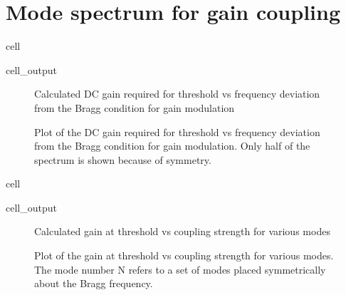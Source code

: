 \documentclass[a4paper,10pt,english,openany,oneside]{jupyterBook}
\begin{document}
\section{Mode spectrum for gain coupling}
\label{\detokenize{Kogelnik-Shank_Coupled-Wave-Theory_DFB-Lasers:mode-spectrum-for-gain-coupling}}
\begin{sphinxuseclass}{cell}\begin{sphinxVerbatimOutput}

\begin{sphinxuseclass}{cell_output}
\begin{figure}[htbp]
\centering
\capstart

\noindent{}
\caption{Calculated DC gain required for threshold vs frequency deviation from the Bragg condition for gain modulation}\label{\detokenize{Kogelnik-Shank_Coupled-Wave-Theory_DFB-Lasers:kogelnik7c}}\end{figure}

\end{sphinxuseclass}\end{sphinxVerbatimOutput}

\end{sphinxuseclass}
\begin{figure}[htbp]
\centering
\capstart

\noindent{}
\caption{Plot of the DC gain required for threshold vs frequency deviation from the Bragg condition for gain modulation. Only half of the spectrum is shown because of symmetry.}\label{\detokenize{Kogelnik-Shank_Coupled-Wave-Theory_DFB-Lasers:kogelnik7}}\end{figure}

\begin{sphinxuseclass}{cell}\begin{sphinxVerbatimOutput}

\begin{sphinxuseclass}{cell_output}
\begin{figure}[htbp]
\centering
\capstart

\noindent{}
\caption{Calculated gain at threshold vs coupling strength for various modes}\label{\detokenize{Kogelnik-Shank_Coupled-Wave-Theory_DFB-Lasers:kogelnik8c}}\end{figure}

\end{sphinxuseclass}\end{sphinxVerbatimOutput}

\end{sphinxuseclass}
\begin{figure}[htbp]
\centering
\capstart

\noindent{}
\caption{Plot of the gain at threshold vs coupling strength for various modes. The mode number N refers to a set of modes placed symmetrically about the Bragg frequency.}\label{\detokenize{Kogelnik-Shank_Coupled-Wave-Theory_DFB-Lasers:kogelnik8}}\end{figure}
\end{document}
